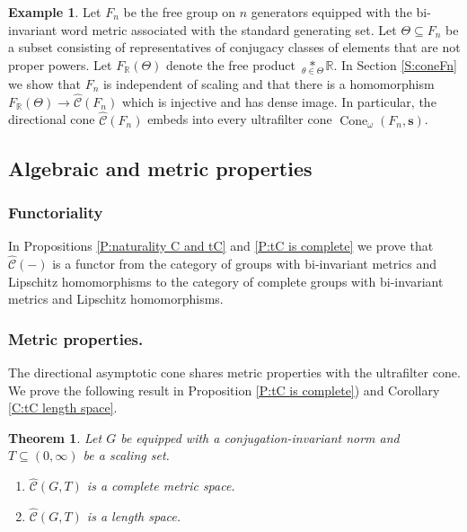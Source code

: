 \documentclass[12pt]{amsart}
\newtheorem{theorem}[prop]{Theorem}
\theoremstyle{definition}
\newtheorem{example}[prop]{Example}
\def\RR{\ensuremath{\mathbb{R}}}
\newcommand{\B}[1]{\mathbf{#1}}
\newcommand{\OP}[1]{\operatorname{#1}}
\def\Cone{\OP{Cone}}
\def\Free{F}
\def\tC{\hat{\mathcal{C}}}
\begin{document}
\begin{example}
Let ${\Free}_n$ be the free group on $n$ generators equipped with the bi-invariant word metric associated with the standard generating set.
Let $\Theta \subseteq {\Free}_n$ be a subset consisting of representatives of conjugacy classes of elements that are not proper powers. 
Let $\Free_\RR(\Theta)$ denote the free product $\underset{\theta \in \Theta}{*} \RR$.
In Section \ref{S:coneFn} we show that $\Free_n$ is independent of scaling and that there is a homomorphism $\Free_\RR(\Theta) \to \tC(\Free_n)$ which is injective and has dense image. In particular, the directional cone $\tC(\Free_n)$ embeds
into every ultrafilter cone $\Cone_{\omega}(\Free_n,\B s)$.
\end{example}




\subsection{Algebraic and metric properties}

\subsubsection*{Functoriality}
In Propositions \ref{P:naturality C and tC} and \ref{P:tC is complete} we prove that $\tC(-)$ is a functor from the category of groups with bi-invariant metrics and Lipschitz homomorphisms to the category of complete groups with bi-invariant metrics and Lipschitz homomorphisms.

\subsubsection*{Metric properties.}
The directional asymptotic cone shares metric properties with the ultrafilter cone.
We prove the following result in Proposition \ref{P:tC is complete}) and Corollary \ref{C:tC length space}.


\begin{theorem}
Let $G$ be equipped with a conjugation-invariant norm and $T \subseteq (0,\infty)$ be a scaling set.
\begin{enumerate}[label=(\alph*)]
\item
$\tC(G,T)$ is a complete metric space.

\item
$\tC(G,T)$ is a length space.
\end{enumerate}
\end{theorem}
\end{document}
